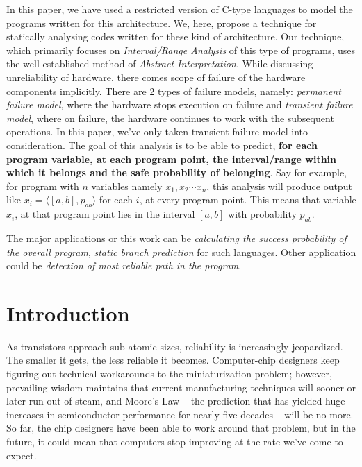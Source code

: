 \documentclass[final,3p, review, times]{Elsevier/elsarticle}
\begin{document}
In this paper, we have used a restricted version of C-type languages to model the programs written for this architecture. We, here, propose a technique for statically analysing codes written for these kind of architecture. Our technique, which primarily focuses on \textit{Interval/Range Analysis} of this type of programs, uses the well established method of \textit{Abstract Interpretation}. While discussing unreliability of hardware, there comes scope of failure of the hardware components implicitly. There are 2 types of failure models, namely: \emph{permanent failure model}, where the hardware stops execution on failure and \emph{transient failure model}, where on failure, the hardware continues to work with the subsequent operations. In this paper, we've only taken transient failure model into consideration. The goal of this analysis is to be able to predict, \textbf{for each program variable, at each program point, the interval/range within which it belongs and the safe probability of belonging}. Say for example, for program with $n$ variables namely $x_1,x_2\cdots x_n$, this analysis will produce output like $x_i=\langle[a,b],p_{ab}\rangle$ for each $i$, at every program point. This means that variable $x_i$, at that program point lies in the interval $[a,b]$ with probability $p_{ab}$.

The major applications or this work can be \emph{calculating the success probability of the overall program}, \emph{static branch prediction} for such languages. Other application could be \emph{detection of most reliable path in the program}.
\clearpage



\section{Introduction}

As transistors approach sub-atomic sizes, reliability is increasingly jeopardized. The smaller it gets, the less reliable it becomes. Computer-chip designers keep figuring out technical workarounds to the miniaturization problem; however, prevailing wisdom maintains that current manufacturing techniques will sooner or later run out of steam, and Moore’s Law -- the prediction that has yielded huge increases in semiconductor performance for nearly five decades -- will be no more. So far, the chip designers have been able to work around that problem, but in the future, it could mean that computers stop improving at the rate we’ve come to expect.
\end{document}
